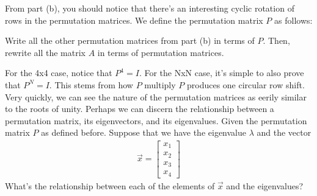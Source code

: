 \begin{enumerate}

\qitem
From part (b), you should notice that there's an interesting cyclic rotation of rows in the permutation matrices.
We define the permutation matrix $P$ as follows:

Write all the other permutation matrices from part (b) in terms of $P$.
Then, rewrite all the matrix $A$ in terms of permutation matrices.


\qitem
For the 4x4 case, notice that $P^{4} = I$.
For the NxN case, it's simple to also prove that $P^{N} = I$.
This stems from how $P$ multiply $P$ produces one circular row shift.
Very quickly, we can see the nature of the permutation matrices as eerily similar to the roots of unity.
Perhaps we can discern the relationship between a permutation matrix, its eigenvectors, and its eigenvalues.
Given the permutation matrix $P$ as defined before.
Suppose that we have the eigenvalue $\lambda$ and the vector
\begin{align*}
\vec{x} =
\begin{bmatrix}
x_{1}\\
x_{2}\\
x_{3}\\
x_{4}
\end{bmatrix}
\end{align*}
What's the relationship between each of the elements of $\vec{x}$ and the eigenvalues?



\end{enumerate}
